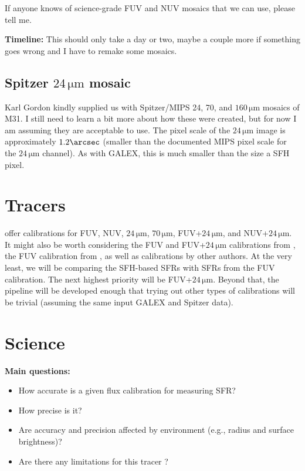 \documentclass[preprint,11pt]{aastex}
\begin{document}
If anyone knows of science-grade FUV and NUV mosaics that we can use, please
tell me.

\textbf{Timeline:} This should only take a day or two, maybe a couple more if
something goes wrong and I have to remake some mosaics.



\subsection{Spitzer $24\,\mathrm{\mu m}$ mosaic}

Karl Gordon kindly supplied us with Spitzer/MIPS 24, 70, and $160\,\mathrm{\mu
m}$ mosaics of M31. I still need to learn a bit more about how these were
created, but for now I am assuming they are acceptable to use. The pixel scale
of the $24\,\mathrm{\mu m}$ image is approximately $1.2\arcsec$ (smaller than
the documented MIPS pixel scale for the $24\,\mathrm{\mu m}$ channel). As with
GALEX, this is much smaller than the size a SFH pixel.





\section{Tracers}

\citet{Kennicutt12} offer calibrations for FUV, NUV, $24\,\mathrm{\mu m}$,
$70\,\mathrm{\mu m}$, FUV+$24\,\mathrm{\mu m}$, and NUV+$24\,\mathrm{\mu m}$.
It might also be worth considering the FUV and FUV+$24\,\mathrm{\mu m}$
calibrations from \citet{Leroy12}, the FUV calibration from \citet{Salim07}, as
well as calibrations by other authors. At the very least, we will be comparing
the SFH-based SFRs with SFRs from the FUV calibration. The next highest
priority will be FUV+$24\,\mathrm{\mu m}$. Beyond that, the pipeline will be
developed enough that trying out other types of calibrations will be trivial
(assuming the same input GALEX and Spitzer data).





\section{Science}

\textbf{Main questions:}
\begin{itemize}
\item How accurate is a given flux calibration for measuring SFR?
\item How precise is it?
\item Are accuracy and precision affected by environment (e.g., radius and
    surface brightness)?
\item Are there any limitations for this tracer \citep[from][we already know
    that small areas/populations being problematic]{Simones14}?
\end{itemize}
\end{document}
